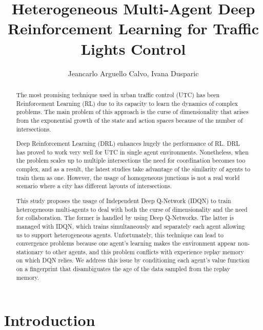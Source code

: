 \documentclass{llncs}
\title{Heterogeneous Multi-Agent Deep Reinforcement Learning for Traffic Lights Control}
\author{Jeancarlo Arguello Calvo, Ivana Dusparic}
\institute{School of Computer Science and Statistics, University of Dublin, Trinity College \\
\email{arguellj@tcd.ie, ivana.dusparic@scss.tcd.ie} }
\begin{document}
\maketitle

\begin{abstract}
The most promising technique used in urban traffic control (UTC) has been Reinforcement Learning (RL) due to its capacity to learn the dynamics of complex problems. The main problem of this approach is the curse of dimensionality that arises from the exponential growth of the state and action spaces because of the number of intersections.
	
	Deep Reinforcement Learning (DRL) enhances hugely the performance of RL. DRL has proved to work very well for UTC in single agent environments. Nonetheless, when the problem scales up to multiple intersections the need for coordination becomes too complex, and as a result, the latest studies take advantage of the similarity of agents to train them as one. However, the usage of homogeneous junctions is not a real world scenario where a city has different layouts of intersections.
	
	This study proposes the usage of Independent Deep Q-Network (IDQN) to train heterogeneous multi-agents to deal with both the curse of dimensionality and the need for collaboration. The former is handled by using Deep Q-Networks. The latter is managed with IDQN, which trains simultaneously and separately each agent allowing us to support heterogeneous agents. Unfortunately, this technique can lead to convergence problems because one agent's learning makes the environment appear non-stationary to other agents, and this problem conflicts with experience replay memory on which DQN relies. We address this issue by conditioning each agent's value function on a fingerprint that disambiguates the age of the data sampled from the replay memory.
\end{abstract}

\section{Introduction}
\end{document}
